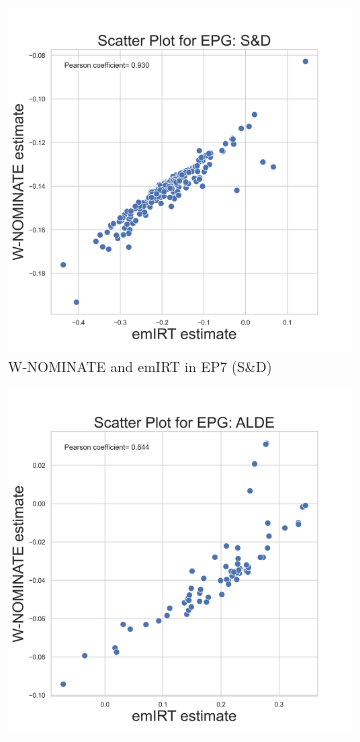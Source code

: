 \documentclass[a4paper,12pt]{report}
\begin{document}
                \begin{figure}[H]
                    \centering
                    \begin{subfigure}[b]{0.48\textwidth}
                        \centering
                        \includegraphics[width=\textwidth]{Graphs/ScatterEMWNOMINATE_7_EPG_S&D}
                        \caption{W-NOMINATE and emIRT in EP7 (S\&D)}
                        \label{fig:WNOMINATE_S&DSCATTER_7}
                    \end{subfigure}
                    \hfill
                    \begin{subfigure}[b]{0.48\textwidth}
                        \centering
                        \includegraphics[width=\textwidth]{Graphs/ScatterEMWNOMINATE_8_EPG_ALDE}

\end{subfigure}
\end{figure}
\end{document}
